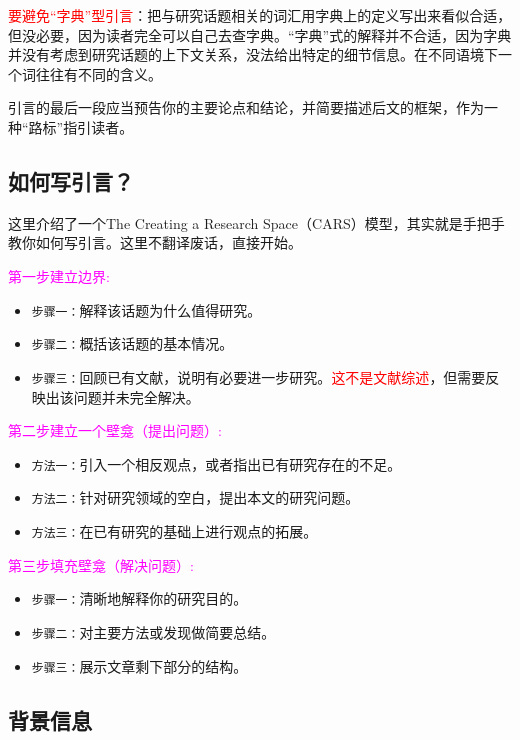 \documentclass[cn,hazy,blue,14pt,screen]{elegantnote} %
\begin{document}
\textcolor{red}{要避免“字典”型引言}：把与研究话题相关的词汇用字典上的定义写出来看似合适，但没必要，因为读者完全可以自己去查字典。“字典”式的解释并不合适，因为字典并没有考虑到研究话题的上下文关系，没法给出特定的细节信息。在不同语境下一个词往往有不同的含义。

引言的最后一段应当预告你的主要论点和结论，并简要描述后文的框架，作为一种“路标”指引读者。

\subsection{如何写引言？}

这里介绍了一个The Creating a Research Space（CARS）模型，其实就是手把手教你如何写引言。这里不翻译废话，直接开始。

\textcolor{magenta}{第一步\quad 建立边界:}

\begin{itemize}
  \item \lstinline{步骤一：}解释该话题为什么值得研究。
  \item \lstinline{步骤二：}概括该话题的基本情况。
  \item \lstinline{步骤三：}回顾已有文献，说明有必要进一步研究。\textcolor{red}{这不是文献综述}，但需要反映出该问题并未完全解决。
\end{itemize}

\textcolor{magenta}{第二步\quad 建立一个壁龛（提出问题）:}

\begin{itemize}
  \item \lstinline{方法一：}引入一个相反观点，或者指出已有研究存在的不足。
  \item \lstinline{方法二：}针对研究领域的空白，提出本文的研究问题。
  \item \lstinline{方法三：}在已有研究的基础上进行观点的拓展。
\end{itemize}

\textcolor{magenta}{第三步\quad 填充壁龛（解决问题）:}

\begin{itemize}
  \item \lstinline{步骤一：}清晰地解释你的研究目的。
  \item \lstinline{步骤二：}对主要方法或发现做简要总结。
  \item \lstinline{步骤三：}展示文章剩下部分的结构。
\end{itemize}

\subsection{背景信息}
\end{document}

